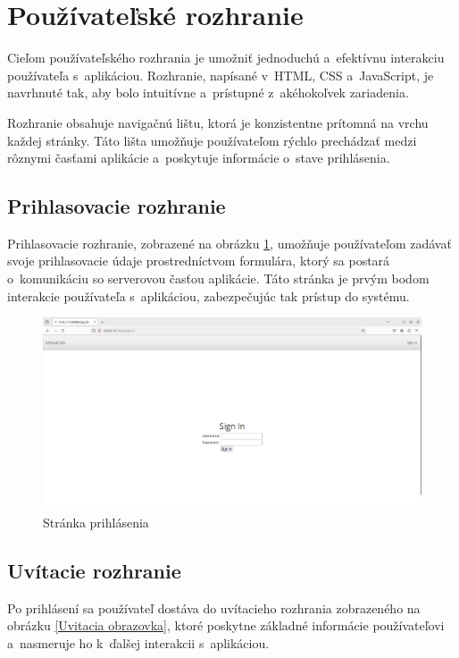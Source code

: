 \section{Používateľské rozhranie}


Cieľom používateľského rozhrania je umožniť jednoduchú a~efektívnu interakciu používateľa s~aplikáciou. Rozhranie, napísané v~HTML, CSS a~JavaScript, je navrhnuté tak, aby bolo intuitívne a~prístupné z~akéhokoľvek zariadenia.

Rozhranie obsahuje navigačnú lištu, ktorá je konzistentne prítomná na vrchu každej stránky. Táto lišta umožňuje používateľom rýchlo prechádzať medzi rôznymi časťami aplikácie a~poskytuje informácie o~stave prihlásenia.

\subsection{Prihlasovacie rozhranie}

Prihlasovacie rozhranie, zobrazené na obrázku \ref{login page}, umožňuje používateľom zadávať svoje prihlasovacie údaje prostredníctvom formulára, ktorý sa postará o~komunikáciu so serverovou časťou aplikácie. Táto stránka je prvým bodom interakcie používateľa s~aplikáciou, zabezpečujúc tak prístup do systému.


\begin{figure} \label{login page}
    \centering
    \includegraphics[width=1\linewidth]{obrazky-figures/Sign_in_site.png}
    \caption{Stránka prihlásenia}
\end{figure}

\subsection{Uvítacie rozhranie}


Po prihlásení sa používateľ dostáva do uvítacieho rozhrania zobrazeného na obrázku \ref{Uvitacia obrazovka}, ktoré poskytne základné informácie používateľovi a~nasmeruje ho k~ďalšej interakcii s~aplikáciou. 



